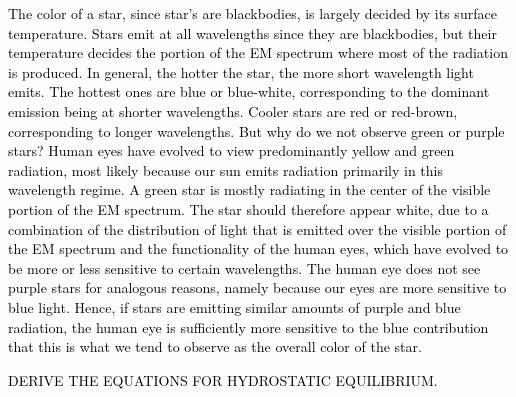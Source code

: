 \documentclass[main.tex]{subfiles}
\begin{document}
\begin{tcolorbox}[sharp corners, colback=blue!30, colframe=blue!80!blue, title=Box \refstepcounter{educhap1}\label{boxchap1:color}\ref{boxchap1:color} -- Why is a star observed to have a given color?]
\par \textcolor{black} {%
The color of a star, since star's are blackbodies, is largely decided by its surface temperature. Stars emit at all wavelengths since they are blackbodies, but their temperature decides the portion of the EM spectrum where most of the radiation is produced.  In general, the hotter the star, the more short wavelength light emits. The hottest ones are blue or blue-white, corresponding to the dominant emission being at shorter wavelengths. Cooler stars are red or red-brown, corresponding to longer wavelengths. 
But why do we not observe green or purple stars?  Human eyes have evolved to view predominantly yellow and green radiation, most likely because our sun emits radiation primarily in this wavelength regime.  A green star is mostly radiating in the center of the visible portion of the EM spectrum. The star should therefore appear white, due to a combination of the distribution of light that is emitted over the visible portion of the EM spectrum and the functionality of the human eyes, which have evolved to be more or less sensitive to certain wavelengths.  The human eye does not see purple stars for analogous reasons, namely because our eyes are more sensitive to blue light.  Hence, if stars are emitting similar amounts of purple and blue radiation, the human eye is sufficiently more sensitive to the blue contribution that this is what we tend to observe as the overall color of the star.}
\end{tcolorbox}

\begin{tcolorbox}[sharp corners, colback=green!30, colframe=green!80!blue, title=Box \refstepcounter{educhap1}\label{boxchap1:sbl}\ref{boxchap1:sbl} -- Stefan-Boltzmann Law]
\par \textcolor{black} {DERIVE THE EQUATIONS FOR HYDROSTATIC EQUILIBRIUM.}
\end{tcolorbox}
\end{document}
